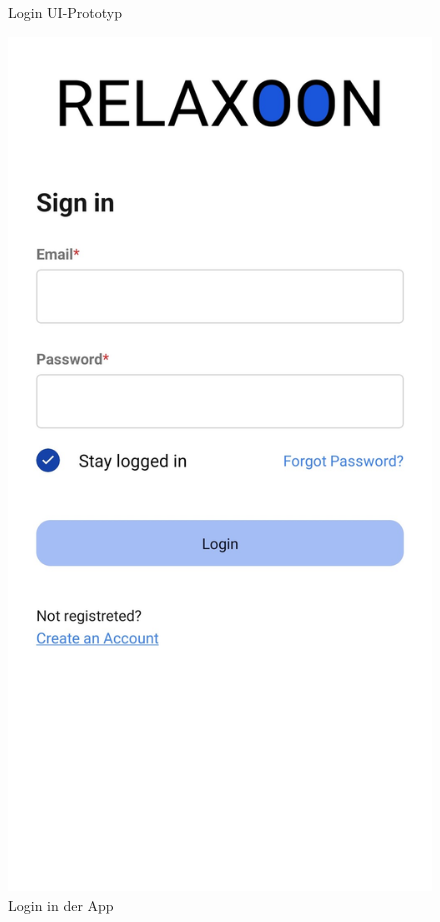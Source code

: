 \begin{figure}[H]
\begin{minipage}{0.5\textwidth}
        \caption{Login UI-Prototyp}
    \end{minipage}
    \begin{minipage}{0.5\textwidth}
        \centering
        \includegraphics[height=2\textwidth]{./pics/login.jpg}
        \caption{Login in der App}
    \end{minipage}
\end{figure}


